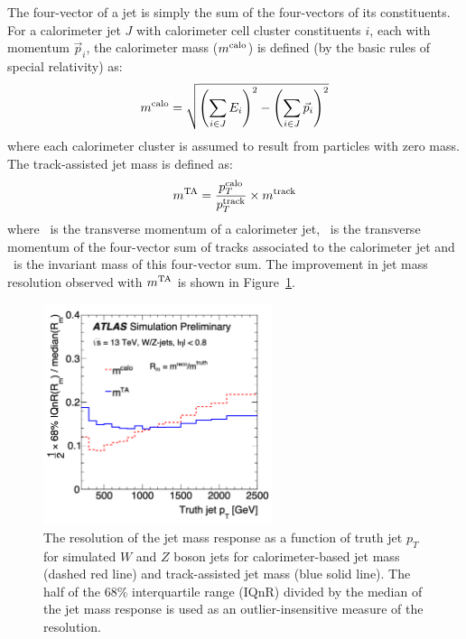 The four-vector of a jet is simply the sum of the four-vectors of its constituents. For a calorimeter jet $J$ with calorimeter cell cluster constituents $i$, each with momentum $\vec{p}_i$, the calorimeter mass ($m^{\mathrm{calo}}$) is defined (by the basic rules of special relativity) as:
\begin{equation}
    m^{\mathrm{calo}} = \sqrt{
        \left(
            \sum_{i \in J} E_i
        \right)^2
            -
        \left(
            \sum_{i \in J} \vec{p}_i
        \right)^2
    }
    \label{eqn:jet_mass}
\end{equation}
where each calorimeter cluster is assumed to result from particles with zero mass. The track-assisted jet mass is defined as:
\begin{equation}
    m^{\mathrm{TA}} = \frac{p_T^{\mathrm{calo}}}{p_T^{\mathrm{track}}} \times m^{\mathrm{track}}
    \label{eqn:ta_jet_mass}
\end{equation}
where \ptCALO\ is the transverse momentum of a calorimeter jet, \ptTRACK\ is the transverse momentum of the four-vector sum of tracks associated to the calorimeter jet and \mTRACK\ is the invariant mass of this four-vector sum.
The improvement in jet mass resolution observed with $m^{\mathrm{TA}}$ is shown in Figure~\ref{fig:ta_vs_comb_mass_res}.

\begin{figure}
	\centering
	\includegraphics[width=0.6\textwidth]{ta_vs_calo_mass_res_wz_jets}
	\caption{
	The resolution of the jet mass response as a function of truth jet $p_T$ for simulated $W$ and $Z$ boson jets for calorimeter-based jet mass (dashed red line) and track-assisted jet mass (blue solid line).
	The half of the 68\% interquartile range (IQnR) divided by the median of the jet mass response is used as an outlier-insensitive measure of the resolution.
	\cite{ATLAS-CONF-2016-035}
	}
	\label{fig:ta_vs_comb_mass_res}
\end{figure}

